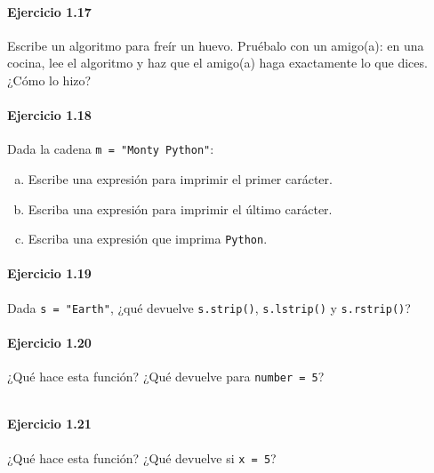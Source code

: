 \paragraph{\color{DarkBlue}Ejercicio 1.17}
Escribe un algoritmo para freír un huevo.
Pruébalo con un amigo(a): en una cocina, lee el algoritmo y haz que
el amigo(a) haga exactamente lo que dices. ¿Cómo lo hizo?

\paragraph{\color{DarkBlue}Ejercicio 1.18}

Dada la cadena \texttt{m = "Monty Python"}:

\begin{enumerate}[(a)]
	\item

	      Escribe una expresión para imprimir el primer carácter.

	\item

	      Escriba una expresión para imprimir el último carácter.

	\item

	      Escriba una expresión que imprima
	      \texttt{Python}.
\end{enumerate}

\paragraph{\color{DarkBlue}Ejercicio 1.19}
Dada \texttt{s = "Earth"}, ¿qué devuelve
\texttt{s.strip()}, \texttt{s.lstrip()} y
\texttt{s.rstrip()}?

\paragraph{\color{DarkBlue}Ejercicio 1.20}
¿Qué hace esta función? ¿Qué devuelve para
\texttt{number = 5}?

\begin{listing}[ht!]
	\inputminted{python}{1.20.py}
\end{listing}

\paragraph{\color{DarkBlue}Ejercicio 1.21}
¿Qué hace esta función? ¿Qué devuelve si \texttt{x = 5}?


